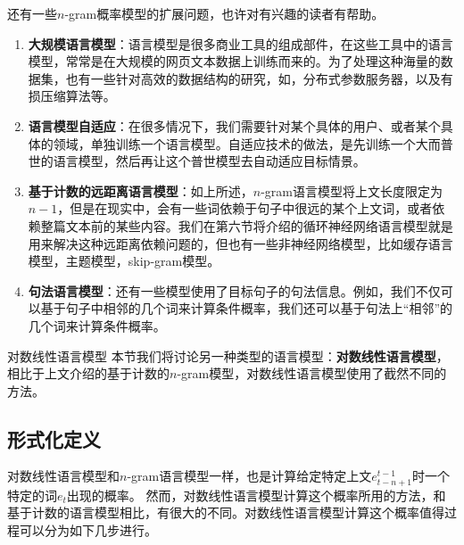 \documentclass[10pt,a4paper]{ctexart}
\makeatletter
\renewcommand{\section}{\@startsection{section}{1}{0mm}
  {-\baselineskip}{0.5\baselineskip}{\bf\leftline}}
\makeatother
\begin{document}
还有一些$n$-gram概率模型的扩展问题，也许对有兴趣的读者有帮助。
\begin{enumerate}
\item[] \textbf{大规模语言模型}：语言模型是很多商业工具的组成部件，在这些工具中的语言模型，常常是在大规模的网页文本数据上训练而来的。为了处理这种海量的数据集，也有一些针对高效的数据结构的研究，如\cite{heafield2011kenlm,pauls2011faster}，分布式参数服务器\cite{brants2007large}，以及有损压缩算法\cite{talbot2008randomized}等。
\item[] \textbf{语言模型自适应}：在很多情况下，我们需要针对某个具体的用户、或者某个具体的领域，单独训练一个语言模型。自适应技术的做法，是先训练一个大而普世的语言模型，然后再让这个普世模型去自动适应目标情景\cite{bellegarda2004statistical}。
\item[] \textbf{基于计数的远距离语言模型}：如上所述，$n$-gram语言模型将上文长度限定为$n-1$，但是在现实中，会有一些词依赖于句子中很远的某个上文词，或者依赖整篇文本前的某些内容。我们在第六节将介绍的循环神经网络语言模型就是用来解决这种远距离依赖问题的，但也有一些非神经网络模型，比如缓存语言模型\cite{kuhn1990cache}，主题模型\cite{blei2003latent}，skip-gram模型\cite{goodman2001bit}。
\item[] \textbf{句法语言模型}：还有一些模型使用了目标句子的句法信息。例如，我们不仅可以基于句子中相邻的几个词来计算条件概率，我们还可以基于句法上“相邻”的几个词来计算条件概率\cite{shen2008new}。
\end{enumerate}


\section{对数线性语言模型}
本节我们将讨论另一种类型的语言模型：\textbf{对数线性语言模型}\cite{rosenfeld1996maximum,chen2000survey}，相比于上文介绍的基于计数的$n$-gram模型，对数线性语言模型使用了截然不同的方法。

\subsection{形式化定义}
对数线性语言模型和$n$-gram语言模型一样，也是计算给定特定上文$e_{t-n+1}^{t-1}$时一个特定的词$e_t$出现的概率。
然而，对数线性语言模型计算这个概率所用的方法，和基于计数的语言模型相比，有很大的不同。对数线性语言模型计算这个概率值得过程可以分为如下几步进行。
\end{document}
